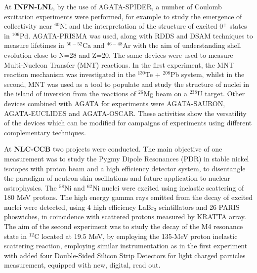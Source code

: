 At \textbf{INFN-LNL}, by the use of AGATA-SPIDER, a number of Coulomb excitation experiments were performed, for example to study the emergence of collectivity near $^{60}$Ni %
and the interpretation of the structure of excited 0$^+$ states in $^{106}$Pd. %
AGATA-PRISMA was used, along with RDDS and DSAM techniques to measure lifetimes in $^{50-52}$Ca and $^{46-48}$Ar with the aim of  understanding shell evolution close to N=28 and Z=20. The same devices were used to measure Multi-Nucleon Transfer (MNT) reactions. In the first experiment, the MNT reaction mechanism was investigated in the $^{130}$Te + $^{208}$Pb system, 
whilst in the second, MNT was used as a tool to populate and study the structure of nuclei in the island of inversion from the reactions of $^{26}$Mg beam on a $^{238}$U target. Other devices combined with AGATA for experiments were AGATA-SAURON, AGATA-EUCLIDES and AGATA-OSCAR. These activities show the versatility of the devices which can be modified for campaigns of experiments using different complementary techniques.


At \textbf{NLC-CCB} two projects were conducted. The main objective of one measurement was to study the Pygmy Dipole Resonances (PDR) in stable nickel isotopes with proton beam and a high efficiency detector system, to disentangle the paradigm of neutron skin oscillations and future application to nuclear astrophysics. The $^{58}$Ni and $^{62}$Ni nuclei were excited using inelastic scattering of 180 MeV protons. The high energy gamma rays emitted from the decay of excited nuclei were detected, using 4 high efficiency LaBr$_3$ scintillators and 26 PARIS phoswiches, in coincidence with scattered protons measured by KRATTA array. 
The aim of the second  experiment was to study the decay of the M4 resonance state in $^{12}$C located at 19.5 MeV, by employing the 135-MeV proton inelastic scattering reaction, employing similar instrumentation as in the first experiment with added four Double-Sided Silicon Strip Detectors for light charged particles measurement, equipped with new, digital, read out.

